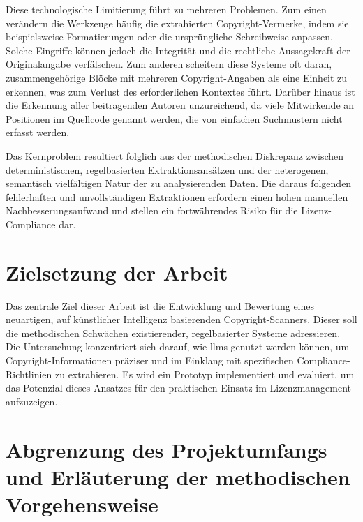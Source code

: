 Diese technologische Limitierung führt zu mehreren Problemen.
Zum einen verändern die Werkzeuge häufig die extrahierten Copyright-Vermerke, indem sie beispielsweise Formatierungen oder die ursprüngliche Schreibweise anpassen.
Solche Eingriffe können jedoch die Integrität und die rechtliche Aussagekraft der Originalangabe verfälschen.
Zum anderen scheitern diese Systeme oft daran, zusammengehörige Blöcke mit mehreren Copyright-Angaben als eine Einheit zu erkennen, was zum Verlust des erforderlichen Kontextes führt.
Darüber hinaus ist die Erkennung aller beitragenden Autoren unzureichend, da viele Mitwirkende an Positionen im Quellcode genannt werden, die von einfachen Suchmustern nicht erfasst werden.

Das Kernproblem resultiert folglich aus der methodischen Diskrepanz zwischen deterministischen, regelbasierten Extraktionsansätzen und der heterogenen, semantisch vielfältigen Natur der zu analysierenden Daten.
Die daraus folgenden fehlerhaften und unvollständigen Extraktionen erfordern einen hohen manuellen Nachbesserungsaufwand und stellen ein fortwährendes Risiko für die Lizenz-Compliance dar.


\section{Zielsetzung der Arbeit}\label{sec:zielsetzung}

Das zentrale Ziel dieser Arbeit ist die Entwicklung und Bewertung eines neuartigen, auf künstlicher Intelligenz basierenden Copyright-Scanners.
Dieser soll die methodischen Schwächen existierender, regelbasierter Systeme adressieren.
Die Untersuchung konzentriert sich darauf, wie \glspl{llm} genutzt werden können, um Copyright-Informationen präziser und im Einklang mit spezifischen Compliance-Richtlinien zu extrahieren.
Es wird ein Prototyp implementiert und evaluiert, um das Potenzial dieses Ansatzes für den praktischen Einsatz im Lizenzmanagement aufzuzeigen.


\section{Abgrenzung des Projektumfangs und Erläuterung der methodischen Vorgehensweise}\label{sec:abgrenzung}

